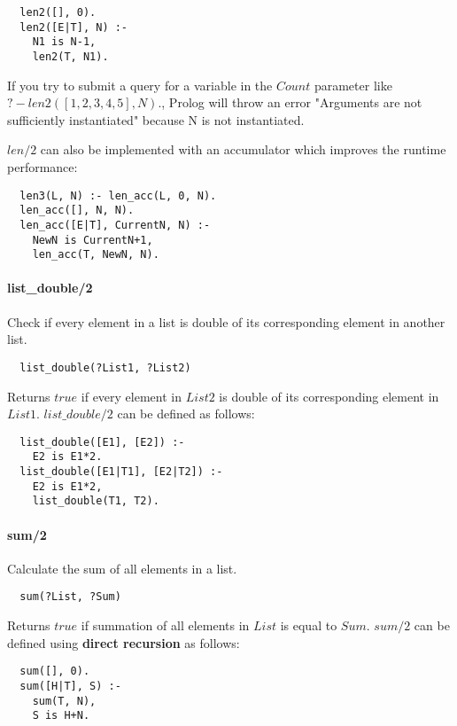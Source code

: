 \documentclass{article}
\begin{document}
\begin{multicols}{2}
  \begin{lstlisting} 
  len2([], 0).
  len2([E|T], N) :-
    N1 is N-1,
  	len2(T, N1).
  \end{lstlisting}
  
  If you try to submit a query for a variable in the $Count$ parameter like $?- len2([1, 2, 3, 4, 5], N).$, Prolog will throw an error "Arguments are not sufficiently instantiated" because N is not instantiated.
  
  $len/2$ can also be implemented with an accumulator which improves the runtime performance:
  
  \begin{lstlisting} 
  len3(L, N) :- len_acc(L, 0, N).
  len_acc([], N, N).
  len_acc([E|T], CurrentN, N) :-
	NewN is CurrentN+1,
	len_acc(T, NewN, N).
  \end{lstlisting}  
  
  \paragraph{list\_double/2} Check if every element in a list is double of its corresponding element in another list.
  
  \begin{lstlisting}
  list_double(?List1, ?List2)
  \end{lstlisting} 
  
  Returns $true$ if every element in $List2$ is double of its corresponding element in $List1$. $list\_double/2$ can be defined as follows:

  \begin{lstlisting}
  list_double([E1], [E2]) :-
    E2 is E1*2.
  list_double([E1|T1], [E2|T2]) :-
    E2 is E1*2,
    list_double(T1, T2).
  \end{lstlisting} 
  
  \paragraph{sum/2} Calculate the sum of all elements in a list.
  
  \begin{lstlisting}
  sum(?List, ?Sum)
  \end{lstlisting} 
  
  Returns $true$ if summation of all elements in $List$ is equal to $Sum$. $sum/2$ can be defined using {\bf direct recursion} as follows:

  \begin{lstlisting}
  sum([], 0).
  sum([H|T], S) :-
    sum(T, N),
    S is H+N.
  \end{lstlisting} 
  

\end{multicols}
\end{document}
